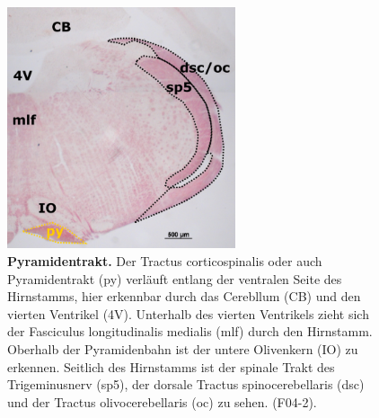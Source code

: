 \documentclass[12pt,a4paper,pdftex]{article}
\begin{document}
\begin{figure}[H]
    \centering
    \includegraphics[width=0.6\textwidth]{pictures/Bilder_Laura/py_F04_2P_025x.png}
    \caption[Pyramidentrakt]{\textbf{Pyramidentrakt.} Der Tractus corticospinalis oder auch Pyramidentrakt (py) verläuft entlang der ventralen Seite des Hirnstamms, hier erkennbar durch das Cerebllum (CB) und den vierten Ventrikel (4V). Unterhalb des vierten Ventrikels zieht sich der Fasciculus longitudinalis medialis (mlf) durch den Hirnstamm. Oberhalb der Pyramidenbahn ist der untere Olivenkern (IO) zu erkennen. Seitlich des Hirnstamms ist der spinale Trakt des Trigeminusnerv (sp5), der dorsale Tractus spinocerebellaris (dsc) und der Tractus olivocerebellaris (oc) zu sehen. (F04-2).}
    \label{fig:pyramidentrakt}
\end{figure}
\end{document}
